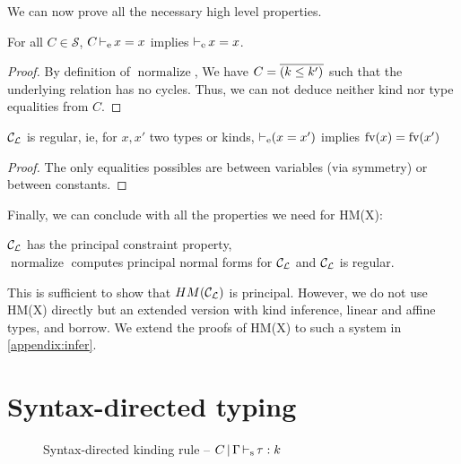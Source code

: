 We can now prove all the necessary high level properties.

\begin{lemma}
  For all $C\in\mathcal S$, $C \operatorname{\vdash_e} x = x$ implies
  $\operatorname{\vdash_e} x = x$.
\end{lemma}
\begin{proof}
  By definition of $\operatorname{normalize}$, We have $C = \overline{(k \leq k')_{{}}}$
  such that the underlying relation has no cycles.
  Thus, we can not deduce neither kind nor type equalities from $C$.
\end{proof}

\begin{property}
  ${\mathcal C_{\mathcal L}}$ is regular, ie, for $x, x'$ two types or kinds,
  $\operatorname{\vdash_e} (x = x')$ implies
  $\operatorname{fv}(x) = \operatorname{fv}(x')$
\end{property}
\begin{proof}
  The only equalities possibles are between variables (via symmetry) or
  between constants.
\end{proof}

Finally, we can conclude with all the properties we need for
HM(X):

\begin{theorem}
  ${\mathcal C_{\mathcal L}}$ has the principal constraint property,\\
  $\operatorname{normalize}$ computes principal normal forms for ${\mathcal C_{\mathcal L}}$
  and ${\mathcal C_{\mathcal L}}$ is regular.
\end{theorem}


This is sufficient to show that $HM({\mathcal C_{\mathcal L}})$ is principal. However,
we do not use HM(X) directly but an extended version with kind inference,
linear and affine types, and borrow.
We extend the proofs of HM(X) to such a system in \cref{appendix:infer}.


\section{Syntax-directed typing}
\label{appendix:sdtyping}

\begin{figure}[bt]
  \centering
  
  \caption{Syntax-directed kinding rule --
    $C \operatorname{|} \Gamma \operatorname{\vdash_s} \tau : k$}
  \label{rules:sd-kinding}
\end{figure}

